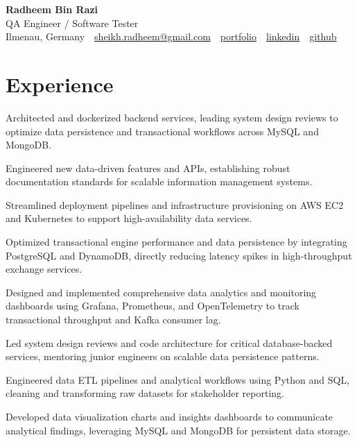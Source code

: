 \documentclass[10pt,a4paper]{resume}
\makeatletter
\newcommand{\Portfolio}{https://radheem.github.io/my-cv}
\newcommand{\PortfolioText}{portfolio}
\newcommand{\GitHub}{https://github.com/radheem}
\newcommand{\LinkedIn}{https://www.linkedin.com/in/radheem-razi}
\newcommand{\Email}{sheikh.radheem@gmail.com}
\makeatother
\begin{document}
\begin{center}
  {\huge\bfseries Radheem Bin Razi}\\[3pt]
  {\large QA Engineer / Software Tester}\\[6pt]
  \small
  Ilmenau, Germany \,\textbar\,
  \href{mailto:\Email}{\Email} \,\textbar\,
  \href{\Portfolio}{\PortfolioText} \,\textbar\,
  \href{\LinkedIn}{linkedin} \,\textbar\,
  \href{\GitHub}{github}
\end{center}
\vspace{2pt}

\section{Experience}

\bullets
  \item Architected and dockerized backend services, leading system design reviews to optimize data persistence and transactional workflows across MySQL and MongoDB.
  \item Engineered new data-driven features and APIs, establishing robust documentation standards for scalable information management systems.
  \item Streamlined deployment pipelines and infrastructure provisioning on AWS EC2 and Kubernetes to support high-availability data services.
\bulletsend
\vspace{1.5pt}
\bullets
  \item Optimized transactional engine performance and data persistence by integrating PostgreSQL and DynamoDB, directly reducing latency spikes in high-throughput exchange services.
  \item Designed and implemented comprehensive data analytics and monitoring dashboards using Grafana, Prometheus, and OpenTelemetry to track transactional throughput and Kafka consumer lag.
  \item Led system design reviews and code architecture for critical database-backed services, mentoring junior engineers on scalable data persistence patterns.
\bulletsend
\vspace{1.5pt}
\bullets
  \item Engineered data ETL pipelines and analytical workflows using Python and SQL, cleaning and transforming raw datasets for stakeholder reporting.
  \item Developed data visualization charts and insights dashboards to communicate analytical findings, leveraging MySQL and MongoDB for persistent data storage.
\bulletsend
\vspace{1.5pt}
\end{document}
